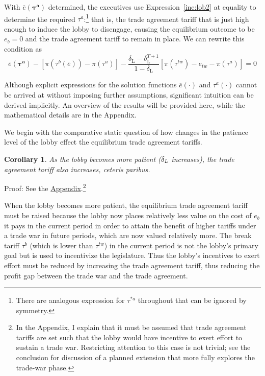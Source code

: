\documentclass[authoryear, review]{elsarticle}
\newtheorem{corollary}{Corollary}
\newcommand{\ov}{\overline}
\newcommand{\bta}{\bm{\tau^a}}
\newcommand{\de}{\delta}
\begin{document}
With $\ov{e}(\bta)$ determined, the executives use Expression~\ref{ine:lob2} at equality to determine the required $\tau^a$:\footnote{There are analogous expression for $\tau^{*a}$ throughout that can be ignored by symmetry.} that is, the trade agreement tariff that is just high enough to induce the lobby to disengage, causing the equilibrium outcome to be $e_b = 0$ and the trade agreement tariff to remain in place. We can rewrite this condition as
\begin{equation}
  \ov{e}(\bta) - \left[ \pi(\tau^b(\ov{e})) - \pi(\tau^a) \right] - \frac{\de_\text{L} - \de_\text{L}^{T+1}}{1-\de_\text{L}} \left[\pi(\tau^{tw}) -e_{tw} - \pi(\tau^a) \right] = 0
  \label{eq:lob2}
\end{equation}

Although explicit expressions for the solution functions $\ov{e}(\cdot)$ and $\tau^a(\cdot)$ cannot be arrived at without imposing further assumptions, significant intuition can be derived implicitly. An overview of the results will be provided here, while the mathematical details are in the Appendix.

We begin with the comparative static question of how changes in the patience level of the lobby effect the equilibrium trade agreement tariffs.

\begin{corollary}
  As the lobby becomes more patient ($\de_\emph{L}$ increases), the trade agreement tariff also increases, \emph{ceteris paribus}.
  \label{cor:tdl}
\end{corollary}

Proof: See the \hyperlink{Cor_tdl}{Appendix}.\footnote{In the Appendix, I explain that it must be assumed that trade agreement tariffs are set such that the lobby would have incentive to exert effort to sustain a trade war. Restricting attention to this case is not trivial; see the conclusion for discussion of a planned extension that more fully explores the trade-war phase.}

\noindent When the lobby becomes more patient, the equilibrium trade agreement tariff must be raised because the lobby now places relatively less value on the cost of $e_b$ it pays in the current period in order to attain the benefit of higher tariffs under a trade war in future periods, which are now valued relatively more. The break tariff $\tau^b$ (which is lower than $\tau^{tw}$) in the current period is not the lobby's primary goal but is used to incentivize the legislature. Thus the lobby's incentives to exert effort must be reduced by increasing the trade agreement tariff, thus reducing the profit gap between the trade war and the trade agreement.
\end{document}
